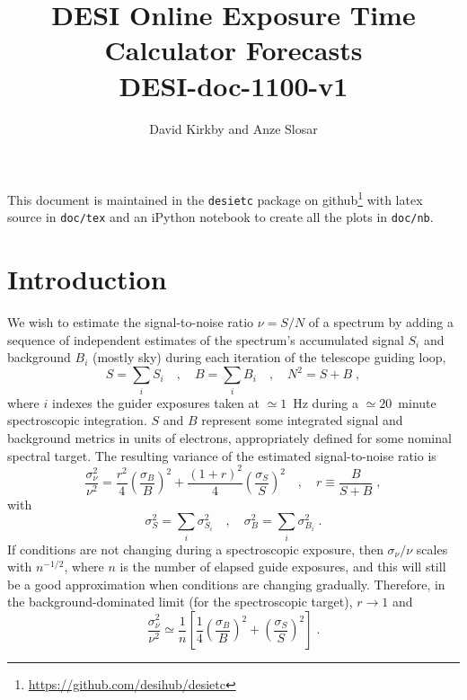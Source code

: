 \documentclass[11pt]{article}
\title{DESI Online Exposure Time Calculator Forecasts\\
{\Large DESI-doc-1100-v1}}
\author{David Kirkby and Anze Slosar}
\begin{document}
\maketitle

This document is maintained in the {\tt desietc} package on github\footnote{\url{https://github.com/desihub/desietc}} with latex source in {\tt doc/tex} and an iPython notebook to create all the plots in {\tt doc/nb}.

\section{Introduction}

We wish to estimate the signal-to-noise ratio $\nu = S/N$ of a spectrum by adding a sequence of independent estimates of the spectrum's accumulated signal $S_i$ and background $B_i$ (mostly sky) during each iteration of the telescope guiding loop,
\begin{equation}
S = \sum_i S_i \quad, \quad B = \sum_i B_i \quad , \quad N^2 = S + B \; ,
\end{equation}
where $i$ indexes the guider exposures taken at $\simeq 1$~Hz during a $\simeq 20$~minute spectroscopic integration. $S$ and $B$ represent some integrated signal and background metrics in units of electrons, appropriately defined for some nominal spectral target. The resulting variance of the estimated signal-to-noise ratio is
\begin{equation}
\frac{\sigma_\nu^2}{\nu^2} = \frac{r^2}{4} \left(\frac{\sigma_B}{B}\right)^2 + \frac{(1+r)^2}{4} \left(\frac{\sigma_S}{S}\right)^2
\quad , \quad r \equiv \frac{B}{S+B}
\label{eqn:dnu}
\; ,
\end{equation}
with
\begin{equation}
\sigma_{S}^2 = \sum_i \sigma_{S_i}^2 \quad , \quad \sigma_{B}^2 = \sum_i \sigma_{B_i}^2 \; .
\end{equation}
If conditions are not changing during a spectroscopic exposure, then $\sigma_{\nu}/\nu$ scales with $n^{-1/2}$, where $n$ is the number of elapsed guide exposures, and this will still be a good approximation when conditions are changing gradually. Therefore, in the background-dominated limit (for the spectroscopic target), $r \rightarrow 1$ and
\begin{equation}
\frac{\sigma_\nu^2}{\nu^2} \simeq \frac{1}{n}\left[
\frac{1}{4} \left(\frac{\sigma_B}{B}\right)^2 + \left(\frac{\sigma_S}{S}\right)^2\right] \; .
\label{eqn:snr-bglim}
\end{equation}
\end{document}
